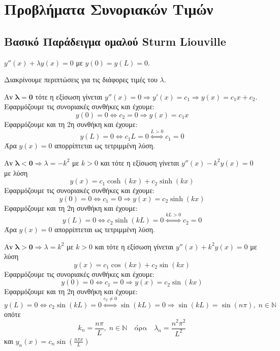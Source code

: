 \documentclass[a4paper,table]{report}
\begin{document}
\chapter*{Προβλήματα Συνοριακών Τιμών}

\section*{Βασικό Παράδειγμα ομαλού Sturm Liouville}


\begin{mybox3}
\begin{example}
  $ y''(x) + \lambda y(x)=0 $ με $ y(0)=y(L)=0 $.
\end{example}
\end{mybox3}
\begin{solution}
  Διακρίνουμε περιπτώσεις για τις διάφορες τιμές του $ \lambda $.
  \begin{myitemize}
    \item Αν $ \bm{\lambda = 0} $ τότε η εξίσωση γίνεται 
      $ y''(x)=0 \Rightarrow y'(x) = c_{1} \Rightarrow y(x) = c_{1}x + c_{2} $. 
      Εφαρμόζουμε τις συνοριακές συνθήκες και έχουμε:
      \[
        y(0)=0 \Leftrightarrow c_{2}=0 \Rightarrow y(x) = c_{1}x 
      \] 
      Εφαρμόζουμε και τη 2η συνθήκη και έχουμε:
      \[
        y(L)=0 \Leftrightarrow c_{1}L=0 \overset{L>0}{\Leftrightarrow} c_{1}=0 
      \]
      Άρα $ y(x)=0 $ απορρίπτεται ως τετριμμένη λύση.
    \item Αν $ \bm{\lambda < 0} \Rightarrow \lambda = -k^{2} $ με $ k>0 $ και τότε η 
      εξίσωση γίνεται $ y''(x) -k^{2}y(x)=0$ με λύση 
      \[ 
        y(x) = c_{1} \cosh{(kx)} + c_{2} \sinh{(kx)} 
      \]
      Εφαρμόζουμε τις συνοριακές συνθήκες και έχουμε:
      \[
        y(0)=0 \Leftrightarrow c_{1}=0 \Rightarrow y(x) = c_{2} \sinh{(kx)}  
      \] 
      Εφαρμόζουμε και τη 2η συνθήκη και έχουμε:
      \[
        y(L)=0 \Leftrightarrow c_{2} \sinh{(kL)} = 0 \overset{kL>0}{\Leftrightarrow} 
        c_{2}=0 
      \]
      Άρα $ y(x)=0 $ απορρίπτεται ως τετριμμένη λύση.
    \item Αν $ \bm{\lambda > 0} \Rightarrow \lambda = k^{2} $ με $ k>0 $ και τότε η 
      εξίσωση γίνεται $ y''(x) +k^{2}y(x)=0$ με λύση 
      \[ 
        y(x) = c_{1} \cos{(kx)} + c_{2} \sin{(kx)} 
      \]
      Εφαρμόζουμε τις συνοριακές συνθήκες και έχουμε:
      \[
        y(0)=0 \Leftrightarrow c_{1}=0 \Rightarrow y(x) = c_{2} \sin{(kx)}  
      \] 
      Εφαρμόζουμε και τη 2η συνθήκη και έχουμε:
      \[
        y(L)=0 \Leftrightarrow c_{2} \sin{(kL)} = 0 \overset{c_{2} 
        \neq 0}{\Leftrightarrow} \sin{(kL)} =0 \Rightarrow \sin{(kL)} = \sin{(n \pi)}, \;
        n \in \mathbb{N} 
      \]
      οπότε 
      \[
        k_{n} = \frac{n \pi}{L} , \; n \in \mathbb{N} \quad \text{άρα} \quad 
        \lambda _{n} = \frac{n^{2} \pi ^{2}}{L^{2}} 
      \] 
      και $ y_{n}(x) = c_{n} \sin{\left(\frac{n \pi x}{L} \right)}  $ 
  \end{myitemize}
\end{solution}
\end{document}
